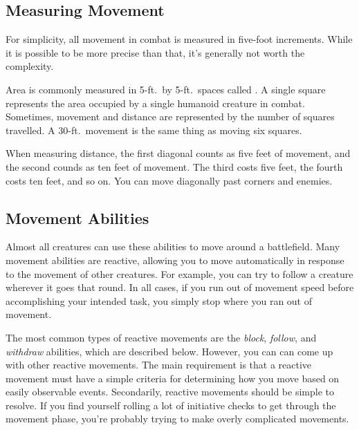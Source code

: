     \subsection{Measuring Movement}

        For simplicity, all movement in combat is measured in five-foot increments.
        While it is possible to be more precise than that, it's generally not worth the complexity.

        \label{Squares} Area is commonly measured in 5-ft.\ by 5-ft.\ spaces called .
        A single square represents the area occupied by a single humanoid creature in combat.
        Sometimes, movement and distance are represented by the number of squares travelled.
        A 30-ft.\ movement is the same thing as moving six squares.

        \label{Diagonals} When measuring distance, the first diagonal counts as five feet of movement, and the second counds as ten feet of movement.
        The third costs five feet, the fourth costs ten feet, and so on.
        You can move diagonally past corners and enemies.

    \subsection{Movement Abilities}\label{Movement Abilities}

        Almost all creatures can use these abilities to move around a battlefield.
        Many movement abilities are reactive, allowing you to move automatically in response to the movement of other creatures.
        For example, you can try to follow a creature wherever it goes that round.
        In all cases, if you run out of movement speed before accomplishing your intended task, you simply stop where you ran out of movement.

        The most common types of reactive movements are the \textit{block}, \textit{follow}, and \textit{withdraw} abilities, which are described below.
        However, you can can come up with other reactive movements.
        The main requirement is that a reactive movement must have a simple criteria for determining how you move based on easily observable events.
        Secondarily, reactive movements should be simple to resolve.
        If you find yourself rolling a lot of initiative checks to get through the movement phase, you're probably trying to make overly complicated movements.

